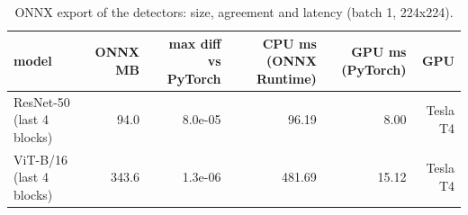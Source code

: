 \begin{table}[t]
\centering
\caption{ONNX export of the detectors: size, agreement and latency (batch 1, 224x224).}
\label{tab:tab_onnx}
\begin{tabular}{lrrrrr}
\toprule
model & ONNX MB & max diff vs PyTorch & CPU ms (ONNX Runtime) & GPU ms (PyTorch) & GPU \\
\midrule
ResNet-50 (last 4 blocks) & 94.0 & 8.0e-05 & 96.19 & 8.00 & Tesla T4 \\
ViT-B/16 (last 4 blocks) & 343.6 & 1.3e-06 & 481.69 & 15.12 & Tesla T4 \\
\bottomrule
\end{tabular}
\end{table}
